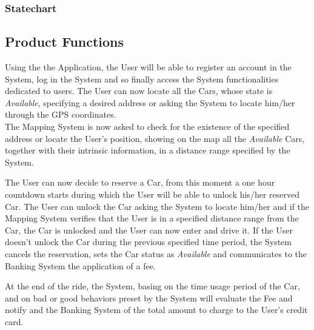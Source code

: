 \subsubsection{Statechart}


\subsection{Product Functions}
Using the the Application, the User will be able to register an account in the System, log in the System and so finally access the System functionalities dedicated to users. The User can now locate all the Cars, whose state is \textit{Available}, specifying a desired address or asking the System to locate him/her through the GPS coordinates.\\
The Mapping System is now asked to check for the existence of the specified address or locate the User's position, showing on the map all the \textit{Available} Cars, together with their intrinsic information, in a distance range specified by the System. 
\smallskip

The User can now decide to reserve a Car, from this moment a one hour countdown starts during which the User will be able to unlock his/her reserved Car.
The User can unlock the Car asking the System to locate him/her and if the Mapping System verifies that the User is in a specified distance range from the Car, the Car is unlocked and the User can now enter and drive it. If the User doesn't unlock the Car during the previous specified time period, the System cancels the reservation, sets the Car status as \textit{Available} and communicates to the Banking System the application of a fee.
\smallskip


At the end of the ride, the System, basing on the time usage period of the Car, and on bad or good behaviors preset by the System will evaluate the Fee and notify and the Banking System of the total amount to charge to the User's credit card.




